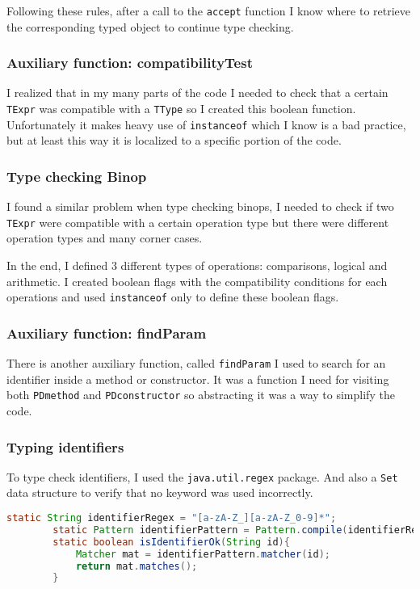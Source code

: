 \documentclass[a4paper,12pt,twoside]{article}
\begin{document}
	Following these rules, after a call to the \texttt{accept} function I know where to retrieve the corresponding typed object to continue type checking.
	
	\subsubsection{Auxiliary function: compatibilityTest}
	
	I realized that in my many parts of the code I needed to check that a certain \texttt{TExpr} was compatible with a \texttt{TType} so I created this boolean function. Unfortunately it makes heavy use of \texttt{instanceof} which I know is a bad practice, but at least this way it is localized to a specific portion of the code.
	
	\subsubsection{Type checking Binop}
	
	I found a similar problem when type checking binops, I needed to check if two \texttt{TExpr} were compatible with a certain operation type but there were different operation types and many corner cases.
	
	In the end, I defined 3 different types of operations: comparisons, logical and arithmetic. I created boolean flags with the compatibility conditions for each operations and used \texttt{instanceof} only to define these boolean flags.
	
	\subsubsection{Auxiliary function: findParam}
	
	There is another auxiliary function, called \texttt{findParam} I used to search for an identifier inside a method or constructor. It was a function I need for visiting both \texttt{PDmethod} and \texttt{PDconstructor} so abstracting it was a way to simplify the code.
	
	\subsubsection{Typing identifiers}
	
	To type check identifiers, I used the \texttt{java.util.regex} package. And also a \texttt{Set} data structure to verify that no keyword was used incorrectly.
	
	\begin{lstlisting}[language=Java]
		static String identifierRegex = "[a-zA-Z_][a-zA-Z_0-9]*";
		static Pattern identifierPattern = Pattern.compile(identifierRegex);
		static boolean isIdentifierOk(String id){
			Matcher mat = identifierPattern.matcher(id);
			return mat.matches();
		}
	\end{lstlisting}
	
\end{document}
